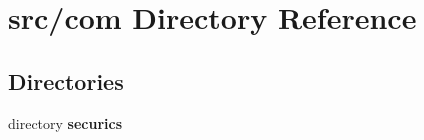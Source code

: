 \section{src/com Directory Reference}
\label{dir_541eb0a6c58a7690acc5b848a4b1b724}
\subsection*{Directories}
\begin{DoxyCompactItemize}
\item 
directory {\bf securics}
\end{DoxyCompactItemize}
